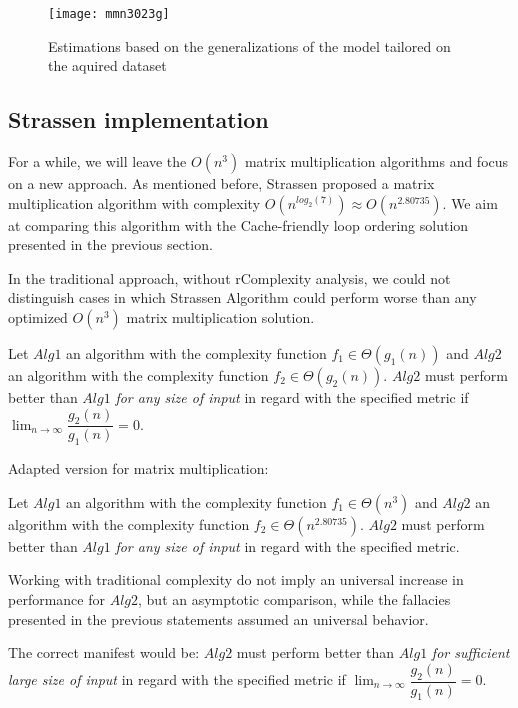\begin{figure}[H]
\centering
\texttt{[image: mmn3023g]}
\caption{Estimations based on the generalizations of the model tailored on the aquired dataset}
\end{figure}

\subsection{Strassen implementation}

For a while, we will leave the $O(n^3)$ matrix multiplication algorithms and focus on a new approach. As mentioned before, Strassen proposed a matrix multiplication algorithm with complexity $O(n^{log_{2}(7)}) \approx O(n^{2.80735})$. We aim at comparing this algorithm with the Cache-friendly loop ordering solution presented in the previous section.

In the traditional approach, without rComplexity analysis, we could not distinguish cases in which Strassen Algorithm could perform worse than any optimized $O(n^3)$ matrix multiplication solution.


\begin{fallacy}
Let $Alg1$ an algorithm with the complexity function $f_{1} \in \Theta(g_1(n))$  and $Alg2$ an algorithm with the complexity function $f_{2} \in \Theta(g_2(n))$. $Alg2$ must perform better than $Alg1$ \textit{for any size of input} in regard with the specified metric if $\lim_{n\to\infty} \dfrac{g_2(n)}{g_1(n)} = 0$.
\end{fallacy}


\begin{fallacy}
Adapted version for matrix multiplication:

Let $Alg1$ an algorithm with the complexity function $f_{1} \in \Theta(n^3)$  and $Alg2$ an algorithm with the complexity function $f_{2} \in \Theta(n^{2.80735})$. $Alg2$ must perform better than $Alg1$ \textit{for any size of input} in regard with the specified metric.
\end{fallacy}

Working with traditional complexity do not imply an universal increase in performance for $Alg2$, but an asymptotic comparison, while the fallacies presented in the previous statements assumed an universal behavior.

The correct manifest would be: $Alg2$ must perform better than $Alg1$ \textit{for sufficient large size of input} in regard with the specified metric if $\lim_{n\to\infty} \dfrac{g_2(n)}{g_1(n)} = 0$.

